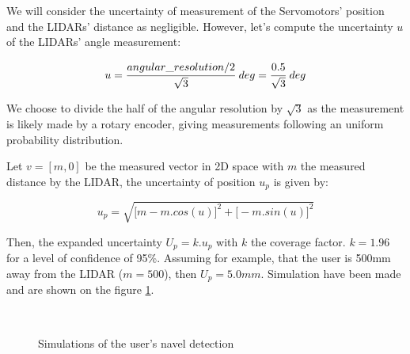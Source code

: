 \documentclass{article}
\newcommand{\vsp}{\vspace{\baselineskip}}
\begin{document}
We will consider the uncertainty of measurement of the Servomotors' position and the LIDARs' distance as negligible. However, let's compute the uncertainty $u$ of the LIDARs' angle measurement:

\begin{equation}
    u = \cfrac{angular\_resolution/2}{\sqrt{3}}\ deg = \cfrac{0.5}{\sqrt{3}}\ deg
\end{equation}

We choose to divide the half of the angular resolution by $\sqrt{3}$ as the measurement is likely made by a rotary encoder, giving measurements following an uniform probability distribution.

\vsp

Let $v=[m,0]$ be the measured vector in 2D space with $m$ the measured distance by the LIDAR, the uncertainty of position $u_p$ is given by:

\begin{equation}
        u_p = \sqrt{\big[ m - m.cos(u) \big] ^2 + \big[ -m.sin(u) \big] ^2}
\end{equation}

Then, the expanded uncertainty $U_p = k.u_p$ with $k$ the coverage factor. $k=1.96$ for a level of confidence of 95\%. Assuming for example, that the user is 500mm away from the LIDAR ($m=500$), then $U_p=5.0mm$. Simulation have been made and are shown on the figure \ref{fig:sim_navel_detection}. 

\begin{figure}[H]
    \centering
        \\
    \caption{Simulations of the user's navel detection}
    \label{fig:sim_navel_detection}
\end{figure}
\end{document}
